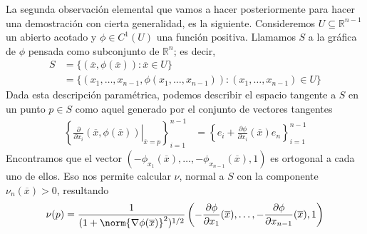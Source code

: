 \documentclass{report}
\newcommand{\realNumbers}{\mathbb{R}}
\theoremstyle{definition}
\theoremstyle{remark}
\begin{document}
  \newpage
  La segunda observación elemental que vamos a hacer posteriormente para hacer una demostración con cierta generalidad, es la siguiente.
  Consideremos \(U \subseteq \realNumbers^{n - 1}\) un abierto acotado y \(\phi \in C^1(U)\) una función positiva.
  Llamamos \(S\) a la gráfica de \(\phi\) pensada como subconjunto de \(\realNumbers^n\);
  es decir,
  \begin{align}
    S
    &=
    \{(\overline{x}, \phi(\overline{x})) : \overline{x} \in U\}
    \\
    &=
    \{(x_1, \dots, x_{n - 1}, \phi(x_1, \dots, x_{n - 1})) : (x_1, \dots, x_{n - 1}) \in U\}
  \end{align}
  Dada esta descripción paramétrica, podemos describir el espacio tangente a \(S\) en un punto \(p \in S\) como aquel generado por el conjunto de vectores tangentes
  \begin{align}
    \left\{
      \left.
        \frac{\partial}{\partial x_i}
        (\overline{x}, \phi(\overline{x}))
      \right\vert_{\overline{x} = p}
    \right\}_{i = 1}^{n - 1}
    &=
    \left\{
      e_i
      +
      \frac{\partial \phi}{\partial x_i}(\overline{x}) e_n
    \right\}_{i = 1}^{n - 1}
  \end{align}
  Encontramos que el vector \((- \phi_{x_1}(\overline{x}), \dots, - \phi_{x_{n - 1}}(\overline{x}), 1)\) es ortogonal a cada uno de ellos.
  Eso nos permite calcular \(\nu\), normal a \(S\) con la componente \(\nu_n(\overline{x}) > 0\), resultando
  \begin{align}
    \nu(p)
    =
    \frac{1}{(1 + \norm{\nabla \phi (\overline{x})}^2)^{1/2}}
    \left(
      - \frac{\partial \phi}{\partial x_1}(\overline{x}), \dots, - \frac{\partial \phi}{\partial x_{n - 1}}(\overline{x}),
      1
    \right)
  \end{align}
  
\end{document}
